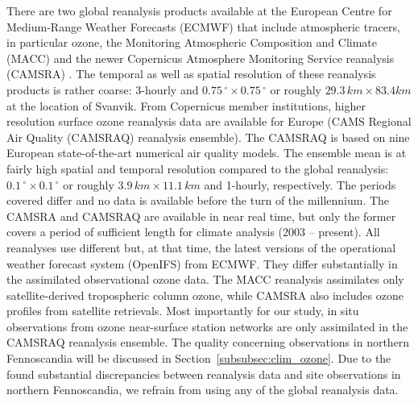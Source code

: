 \documentclass[bg, manuscript]{copernicus}
\begin{document}
There are two global reanalysis products available at the European Centre for Medium-Range Weather Forecasts (ECMWF) that include atmospheric tracers, in particular ozone, the Monitoring Atmospheric Composition and Climate (MACC) and the newer Copernicus Atmosphere Monitoring Service reanalysis (CAMSRA) \citep{ACP:Inness2013, ACP:Inness2019}. The temporal as well as spatial resolution of these reanalysis products is rather coarse: 3-hourly and $0.75\,\unit{^\circ}\times0.75\,\unit{^\circ}$ or roughly $29.3\,\unit{km}\times 83.4\unit{km}$ at the location of Svanvik. From Copernicus member institutions, higher resolution surface ozone reanalysis data are available for Europe (CAMS Regional Air Quality (CAMSRAQ) reanalysis ensemble). The CAMSRAQ is based on nine European state-of-the-art numerical air quality models. The ensemble mean is at fairly high spatial and temporal resolution compared to the global reanalysis: $0.1\,\unit{^\circ}\times 0.1\,\unit{^\circ}$ or roughly $3.9\,\unit{km}\times 11.1\,\unit{km}$ and 1-hourly, respectively. The periods covered differ and no data is available before the turn of the millennium. The CAMSRA and CAMSRAQ are available in near real time, but only the former covers a period of sufficient length for climate analysis (2003 -- present). All reanalyses use different but, at that time, the latest versions of the operational weather forecast system (OpenIFS) from ECMWF. They differ substantially in the assimilated observational ozone data. The MACC reanalysis assimilates only satellite-derived tropospheric column ozone, while CAMSRA also includes ozone profiles from satellite retrievals. Most importantly for our study, in situ observations from ozone near-surface station networks are only assimilated in the CAMSRAQ reanalysis ensemble. The quality concerning observations in northern Fennoscandia will be discussed in Section~\ref{subsubsec:clim_ozone}. Due to the found substantial discrepancies between reanalysis data and site observations in northern Fennoscandia, we refrain from using any of the global reanalysis data.
\end{document}
